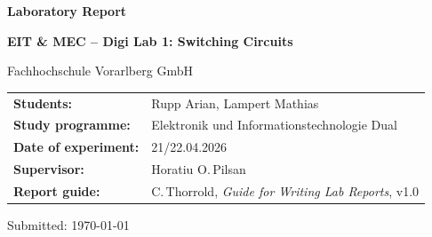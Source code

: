 \documentclass[12pt, a4paper]{article}
\begin{document}

\begin{titlepage}
  \centering
  \vspace*{3cm}
  {\LARGE\bfseries Laboratory Report\par}
  \vspace{0.5cm}
  {\large\bfseries EIT \& MEC -- Digi Lab 1: Switching Circuits\par}
  \vspace{0.3cm}
  {\large Fachhochschule Vorarlberg GmbH\par}
  \vspace{2cm}
  \begin{tabular}{ll}
    \textbf{Students:}          & Rupp Arian, Lampert Mathias \\[4pt]
    \textbf{Study programme:}   & Elektronik und Informationstechnologie Dual \\[4pt]
    \textbf{Date of experiment:}& 21/22.04.2026 \\[4pt]
    \textbf{Supervisor:}        & Horatiu O.\,Pilsan \\[4pt]
    \textbf{Report guide:}      & C.\,Thorrold, \textit{Guide for Writing Lab Reports}, v1.0 \\
  \end{tabular}
  \vfill
  {\small Submitted: \today}
\end{titlepage}

\begin{abstract}
This report documents the experimental investigation of monostable and astable
multivibrators, conducted in Digi Lab~1 at Fachhochschule Vorarlberg on
21/22~April~2026.
Three circuits were assembled and analysed: a monostable multivibrator based on the
NE555 timer IC, an astable multivibrator also using the NE555, and an astable
oscillator built from two CMOS inverters (74C00).
Calculated values for pulse duration and oscillation period were compared against
oscilloscope measurements. The monostable circuit showed a deviation of 7.3\%, 
increasing to 8.2\% with a second IC. Direct BNC measurements proved that 
low-impedance connections disrupt the circuit, preventing the output from returning 
to low. The astable NE555 circuit oscillated at 495.8\,Hz, deviating 3.1\% from 
theory. Results confirmed that component tolerances and probe loading are the 
primary causes of error. Observations also showed that bypass capacitors are 
essential for stable switching edges. All circuits performed according to 
theoretical models within acceptable margins.
\end{abstract}
\end{document}
